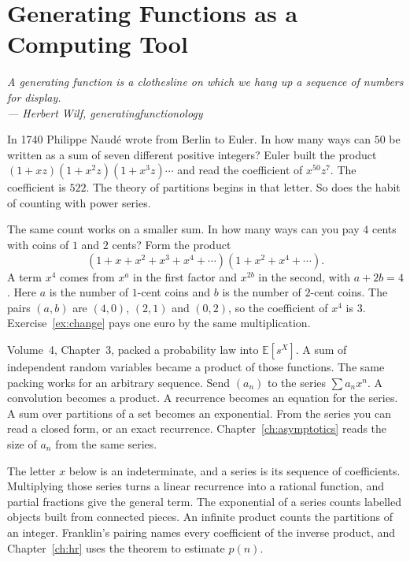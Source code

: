 \chapter{Generating Functions as a Computing Tool}\label{ch:generating}

\begin{center}\itshape
A generating function is a clothesline on which we hang up a sequence of numbers for display.\\
\upshape --- Herbert Wilf, \emph{generatingfunctionology}
\end{center}

In 1740 Philippe Naud\'e wrote from Berlin to Euler. In how many ways can $50$ be written as a sum of seven different positive integers? Euler built the product $(1+xz)(1+x^2z)(1+x^3z)\cdots$ and read the coefficient of $x^{50}z^7$. The coefficient is $522$. The theory of partitions begins in that letter. So does the habit of counting with power series.

The same count works on a smaller sum. In how many ways can you pay $4$ cents with coins of $1$ and $2$ cents? Form the product
\[
(1+x+x^2+x^3+x^4+\cdots)(1+x^2+x^4+\cdots).
\]
A term $x^4$ comes from $x^a$ in the first factor and $x^{2b}$ in the second, with $a+2b=4$. Here $a$ is the number of $1$-cent coins and $b$ is the number of $2$-cent coins. The pairs $(a,b)$ are $(4,0)$, $(2,1)$ and $(0,2)$, so the coefficient of $x^4$ is $3$. Exercise~\ref{ex:change} pays one euro by the same multiplication.

Volume~4, Chapter~3, packed a probability law into $\mathbb E[s^X]$. A sum of independent random variables became a product of those functions. The same packing works for an arbitrary sequence. Send $(a_n)$ to the series $\sum a_nx^n$. A convolution becomes a product. A recurrence becomes an equation for the series. A sum over partitions of a set becomes an exponential. From the series you can read a closed form, or an exact recurrence. Chapter~\ref{ch:asymptotics} reads the size of $a_n$ from the same series.

The letter $x$ below is an indeterminate, and a series is its sequence of coefficients. Multiplying those series turns a linear recurrence into a rational function, and partial fractions give the general term. The exponential of a series counts labelled objects built from connected pieces. An infinite product counts the partitions of an integer. Franklin's pairing names every coefficient of the inverse product, and Chapter~\ref{ch:hr} uses the theorem to estimate $p(n)$.

